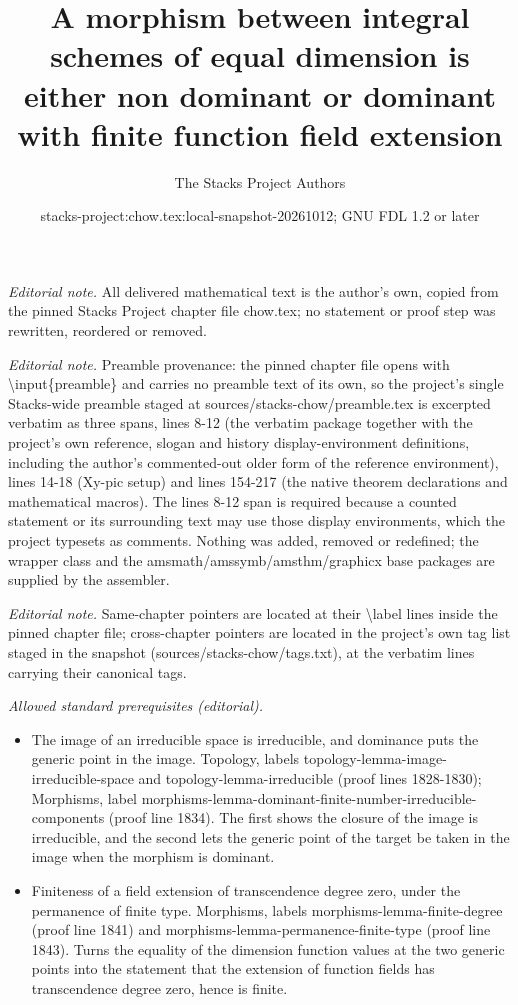 \documentclass[10pt,a4paper]{amsart}
\title{A morphism between integral schemes of equal dimension is either non dominant or dominant with finite function field extension}
\author{The Stacks Project Authors}
\date{stacks-project:chow.tex:local-snapshot-20261012; GNU FDL 1.2 or later}
\theoremstyle{plain}
\theoremstyle{definition}
\theoremstyle{remark}
\numberwithin{equation}{subsection}
\begin{document}
\maketitle
\noindent\textit{Editorial note.} All delivered mathematical text is the author's own, copied from the pinned Stacks Project chapter file chow.tex; no statement or proof step was rewritten, reordered or removed.\par\medskip
\noindent\textit{Editorial note.} Preamble provenance: the pinned chapter file opens with \textbackslash{}input\{preamble\} and carries no preamble text of its own, so the project's single Stacks-wide preamble staged at sources/stacks-chow/preamble.tex is excerpted verbatim as three spans, lines 8-12 (the verbatim package together with the project's own reference, slogan and history display-environment definitions, including the author's commented-out older form of the reference environment), lines 14-18 (Xy-pic setup) and lines 154-217 (the native theorem declarations and mathematical macros). The lines 8-12 span is required because a counted statement or its surrounding text may use those display environments, which the project typesets as comments. Nothing was added, removed or redefined; the wrapper class and the amsmath/amssymb/amsthm/graphicx base packages are supplied by the assembler.\par\medskip
\noindent\textit{Editorial note.} Same-chapter pointers are located at their \textbackslash{}label lines inside the pinned chapter file; cross-chapter pointers are located in the project's own tag list staged in the snapshot (sources/stacks-chow/tags.txt), at the verbatim lines carrying their canonical tags.\par\medskip
\noindent\textit{Allowed standard prerequisites (editorial).}\begin{itemize}
\item The image of an irreducible space is irreducible, and dominance puts the generic point in the image. Topology, labels topology-lemma-image-irreducible-space and topology-lemma-irreducible (proof lines 1828-1830); Morphisms, label morphisms-lemma-dominant-finite-number-irreducible-components (proof line 1834). The first shows the closure of the image is irreducible, and the second lets the generic point of the target be taken in the image when the morphism is dominant.
\item Finiteness of a field extension of transcendence degree zero, under the permanence of finite type. Morphisms, labels morphisms-lemma-finite-degree (proof line 1841) and morphisms-lemma-permanence-finite-type (proof line 1843). Turns the equality of the dimension function values at the two generic points into the statement that the extension of function fields has transcendence degree zero, hence is finite.
\end{itemize}\medskip
\end{document}
